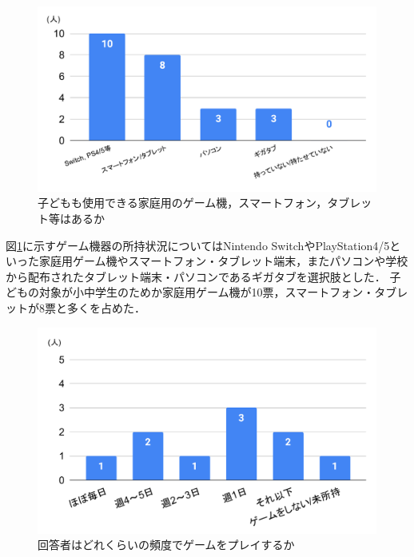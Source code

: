 \documentclass[12pt,a4j,titlepage]{ltjsarticle}
\begin{document}
\begin{figure}[H]
 \begin{center}
  \includegraphics[keepaspectratio, scale=0.6]{PDF/chart1.pdf}
 \end{center}
 \caption{子どもも使用できる家庭用のゲーム機，スマートフォン，タブレット等はあるか}
 \label{fig:ゲーム所持}
\end{figure}

図\ref{fig:ゲーム所持}に示すゲーム機器の所持状況についてはNintendo SwitchやPlayStation4/5といった家庭用ゲーム機やスマートフォン・タブレット端末，またパソコンや学校から配布されたタブレット端末・パソコンであるギガタブを選択肢とした．
子どもの対象が小中学生のためか家庭用ゲーム機が10票，スマートフォン・タブレットが8票と多くを占めた．

\begin{figure}[H]
 \begin{center}
  \includegraphics[keepaspectratio, scale=0.6]{PDF/chart2.pdf}
 \end{center}
 \caption{回答者はどれくらいの頻度でゲームをプレイするか}
 \label{fig:プレイ頻度(回答者)}
\end{figure}
\end{document}
